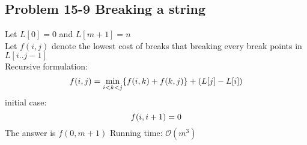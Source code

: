 \subsection*{Problem 15-9 Breaking a string}
\noindent Let $L[0] = 0$ and $L[m + 1] =  n$ \\
Let $f(i, j)$ denote the lowest cost of breaks that breaking every break points in $L[i..j - 1]$ \\
Recursive formulation:
\begin{equation} \notag
	f(i, j) = \min_{i < k < j} \{f(i, k) + f(k, j)\} + (L[j] - L[i])
\end{equation} 
initial case:
\begin{equation} \notag
	f(i, i + 1) = 0
\end{equation}
The answer is $f(0, m + 1)$
Running time: $\mathcal{O}(m^3)$

